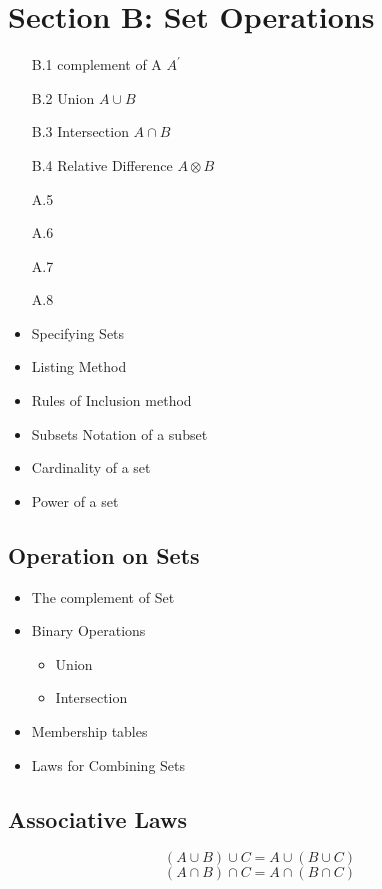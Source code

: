 {{{%
\newpage
\section*{Section B: Set Operations}
\begin{itemize}
\item[B.1] complement of A $A^{\prime}$
\item[B.2] Union $A \cup B$
\item[B.3] Intersection $A \cap B$
\item[B.4] Relative Difference $A \otimes B$
\item[A.5]
\item[A.6]
\item[A.7]
\item[A.8]
\end{itemize}
\newpage


\begin{itemize}
\item Specifying Sets
\item Listing Method
\item Rules of Inclusion method
\end{itemize}


\begin{itemize}
\item Subsets Notation of a subset
\item Cardinality of a set
\item Power of a set
\end{itemize}

\subsection*{Operation on Sets}

\begin{itemize}
\item The complement of Set
\item Binary Operations
\begin{itemize}
\item Union
\item Intersection
\end{itemize}
\item Membership tables
\item Laws for Combining Sets
\end{itemize}

\newpage


\subsection*{Associative Laws}
\[ (A \cup B) \cup C =  A \cup (B \cup C)  \]
\[ (A \cap B) \cap C =  A \cap (B \cap C)  \]

}}}

